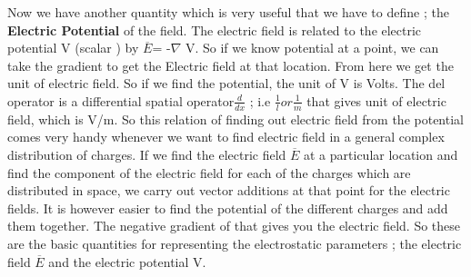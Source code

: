 Now we have another quantity which is very useful that we have to define ; the\textbf{ Electric Potential} of the field. The electric field is related to the electric  potential V (scalar ) by 
$\overline{E}$= -$\nabla $ V.
So if we know potential at a point, we can take the gradient to get the Electric field at that location. From here we get the unit of electric field. So if we find the potential, the unit of V is Volts. The del operator is a differential spatial operator$\frac{d}{dx}$ ; i.e $\frac{1}{l} or\frac{1}{m}$ that gives unit of electric field, which is V/m. So this relation of finding out electric field from the potential comes very handy whenever we want to find electric field in a general complex distribution of charges. If we find the electric field  $\overline{E}$ at a particular location and find the component of the electric field for each of the charges which are distributed in space, we carry out vector additions at that point for the electric fields. It is however easier to find the potential of the different charges and add them together. The negative gradient of that gives you the electric field. So these are the basic quantities for representing the electrostatic parameters ; the electric field  $\overline{E}$ and the electric potential V.




